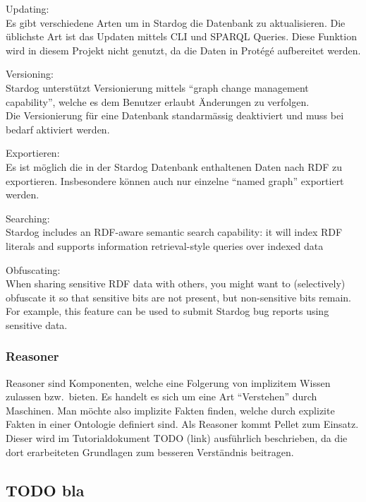 Updating:\\
Es gibt verschiedene Arten um in Stardog die Datenbank zu aktualisieren. Die üblichste Art ist das Updaten mittels CLI und SPARQL Queries. Diese Funktion wird in diesem Projekt nicht genutzt, da die Daten in Protégé aufbereitet werden.

Versioning:\\
Stardog unterstützt Versionierung mittels ``graph change management capability'', welche es dem Benutzer erlaubt Änderungen zu verfolgen.\\
Die Versionierung für eine Datenbank standarmässig deaktiviert und muss bei bedarf aktiviert werden.

Exportieren:\\
Es ist möglich die in der Stardog Datenbank enthaltenen Daten nach RDF zu exportieren. Insbesondere können auch nur einzelne ``named graph'' exportiert werden.

Searching:\\
Stardog includes an RDF-aware semantic search capability: it will index RDF literals and supports information retrieval-style queries over indexed data

Obfuscating:\\
When sharing sensitive RDF data with others, you might want to (selectively) obfuscate it so that sensitive bits are not present, but non-sensitive bits remain. For example, this feature can be used to submit Stardog bug reports using sensitive data.



\subsubsection{Reasoner}
\label{ssubsec:reasoner}

Reasoner sind Komponenten, welche eine Folgerung von implizitem Wissen zulassen bzw.\ bieten. Es handelt es sich um eine Art ``Verstehen'' durch Maschinen. Man möchte also implizite Fakten finden, welche durch explizite Fakten in einer Ontologie definiert sind. 
Als Reasoner kommt Pellet zum Einsatz. Dieser wird im Tutorialdokument TODO (link) ausführlich beschrieben, da die dort erarbeiteten Grundlagen zum besseren Verständnis beitragen.

\subsection{TODO bla }
\label{subsec:protege}


